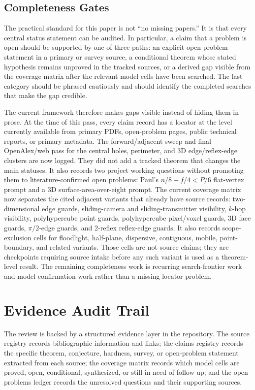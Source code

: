 \documentclass[11pt]{article}
\begin{document}
\subsection*{Completeness Gates}

The practical standard for this paper is not ``no missing papers.''  It is
that every central status statement can be audited.  In particular, a claim
that a problem is open should be supported by one of three paths: an explicit
open-problem statement in a primary or survey source, a conditional theorem
whose stated hypothesis remains unproved in the tracked sources, or a derived
gap visible from the coverage matrix after the relevant model cells have been
searched.  The last category should be phrased cautiously and should identify
the completed searches that make the gap credible.

The current framework therefore makes gaps visible instead of hiding them in
prose.  At the time of this pass, every claim record has a locator at the
level currently available from primary PDFs, open-problem pages, public
technical reports, or primary metadata.  The forward/adjacent sweep and final
OpenAlex/web pass for the central holes, perimeter, and 3D edge/reflex-edge
clusters are now logged.  They did not add a tracked theorem that changes the
main statuses.  It also records two project working questions without
promoting them to literature-confirmed open problems: Paul's
$n/8+f/4<P/6$ flat-vertex prompt and a 3D surface-area-over-eight prompt.
The current coverage matrix now separates the cited adjacent variants that
already have source records: two-dimensional edge guards, sliding-camera and
sliding-transmitter visibility, $k$-hop visibility, polyhypercube point
guards, polyhypercube pixel/voxel guards, 3D face guards, $\pi/2$-edge
guards, and 2-reflex reflex-edge guards.  It also records scope-exclusion
cells for floodlight, half-plane,
dispersive, contiguous, mobile,
point-boundary, and related variants.  Those cells are not source claims; they
are checkpoints requiring source intake before any such variant is used as a
theorem-level result.  The remaining completeness work is recurring
search-frontier work and model-confirmation work rather than a missing-locator
problem.

\section{Evidence Audit Trail}

The review is backed by a structured evidence layer in the repository.  The
source registry records bibliographic information and links; the claims
registry records the specific theorem, conjecture, hardness, survey, or
open-problem statement extracted from each source; the coverage matrix records
which model cells are proved, open, conditional, synthesized, or still in need
of follow-up; and the open-problems ledger records the unresolved questions and
their supporting sources.
\end{document}
